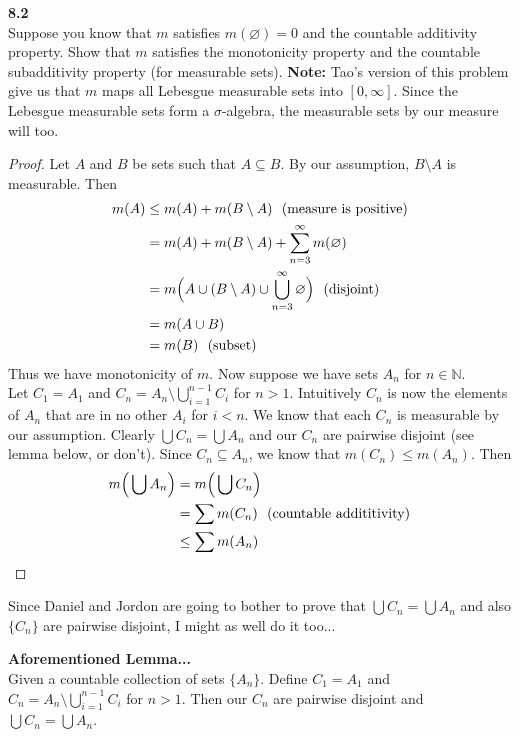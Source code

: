 \documentclass[12pt]{article}
\newcommand{\problem}[1]{\hspace{-4 ex} \large \textbf{#1}\\}
\let\emptyset\varnothing
\begin{document}
\problem{8.2} Suppose you know that $m$ satisfies $m(\emptyset)=0$ and the countable additivity property. Show that $m$ satisfies the monotonicity property and the countable subadditivity property (for measurable sets). \textbf{Note:} Tao's version of this problem give us that $m$ maps all Lebesgue measurable sets into $[0,\infty]$. Since the Lebesgue measurable sets form a $\sigma$-algebra, the measurable sets by our measure will too.

	\begin{proof}
		Let $A$ and $B$ be sets such that $A \subseteq B$. By our assumption, $B \setminus A$ is measurable. Then
		\begin{align*}
			m(A) & \leq m(A) + m(B \setminus A) \text{\space \space (measure is positive)}\\
			& = m(A) + m(B \setminus A) + \sum_{n=3}^\infty m(\emptyset) \\
			& = m\Big(A \cup (B \setminus A) \cup \bigcup_{n=3}^\infty \emptyset\Big) \text{\space \space (disjoint)}\\
			& = m(A \cup B) \\
			& = m(B) \text{\space \space (subset)}
		\end{align*}
		Thus we have monotonicity of $m$. \bigbreak
		Now suppose we have sets $A_n$ for $n \in \mathbb{N}$. \\
		Let $C_1 = A_1$ and $C_n = A_n \setminus \bigcup\limits_{i =1}^{n-1}C_i$ for $n>1$. Intuitively $C_n$ is now the elements of $A_n$ that are in no other $A_i$ for $i<n$. We know that each $C_n$ is measurable by our assumption. Clearly $\bigcup C_n = \bigcup A_n$ and our $C_n$ are pairwise disjoint (see lemma below, or don't). Since $C_n \subseteq A_n$, we know that $m(C_n) \leq m(A_n)$. Then 
		\begin{align*}
			m \Big (\bigcup A_n \Big) & = m \Big( \bigcup C_n \Big) \\
			& = \sum m(C_n) \text{\space \space (countable addititivity)} \\
			& \leq \sum m(A_n)			
		\end{align*}
	\end{proof}
	\bigbreak
	\bigbreak
	
	Since Daniel and Jordon are going to bother to prove that $\bigcup C_n = \bigcup A_n$ and also $\{C_n\}$ are pairwise disjoint, I might as well do it too...
	
\problem{Aforementioned Lemma...}
	Given a countable collection of sets $\{A_n\}$. Define $C_1 = A_1$ and \\
	$C_n = A_n \setminus \bigcup\limits_{i =1}^{n-1}C_i$ for $n>1$. Then our $C_n$ are pairwise disjoint and \\
	$\bigcup C_n = \bigcup A_n$.
	
\end{document}
